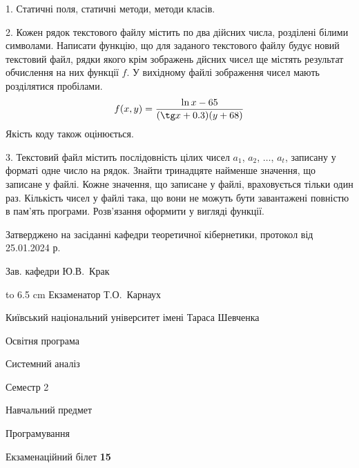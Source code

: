 \documentclass[12pt, ukrainian]{article}
\begin{document}
{%
1. Статичні поля, статичні методи, методи класів.%
\par
\vspace{2mm}

2. Кожен рядок текстового файлу містить по два дійсних числа, розділені білими символами.
Написати функцію, що для заданого текстового файлу будує новий текстовий файл, рядки якого крім зображень дйсних чисел ще містять результат обчислення на них функції $f$. У вихідному файлі зображення чисел мають розділятися пробілами. 
$$f(x, y) =\frac{\ln x - 65}{(\tg x + 0.3) (y + 68)}$$ 
Якість коду також оцінюється.

\par
\vspace{2mm}

3. Текстовий файл містить послідовність цілих чисел $a_1$, $a_2$, $\ldots$, $a_t$, записану у форматі одне число на рядок. Знайти тринадцяте найменше значення, що записане у файлі. Кожне значення, що записане у файлі, враховується тільки один раз. Кількість чисел у файлі така, що вони не можуть бути завантажені повністю в пам'ять програми. Розв'язання оформити у вигляді функції.

}
{\smallskip\smallskip \begin {scriptsize} Затверджено на засіданні кафедри теоретичної кібернетики, протокол   від   25.01.2024 р.\par\smallskip\smallskip\smallskip\smallskip
{\parbox {6.5 cm} {Зав. кафедри \dotfill Ю.В.~Крак}}\hspace {0.7cm} {\hbox to 6.5 cm { Екзаменатор \dotfill Т.О.~Карнаух}} \end{scriptsize}}
\newpage
{{\begin {scriptsize}\par
{ \center  Київський національний університет імені Тараса Шевченка \par}
{\parbox {5 cm}{Освітня програма \hfill}{\parbox {7 cm}{Системний аналіз\hfill}}\parbox {6 cm}{\hfill Семестр 2}}\par
{\parbox {5 cm} {Навчальний предмет \hfill}\parbox {7 cm}{Програмування \hfill}\parbox {6cm}{\hfill}\par}\vspace{-15pt} \end{scriptsize}}{\center Екзаменаційний білет \No \textbf { 15 }\par}}
\end{document}
